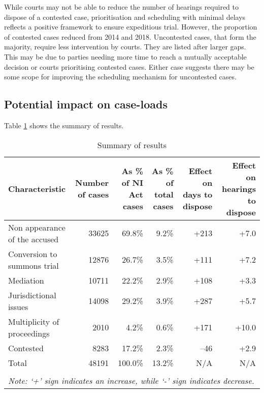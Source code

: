 While courts may not be able to reduce the number of hearings required to dispose of a contested case, prioritisation and scheduling with minimal delays reflects a positive framework to ensure expeditious trial. However, the proportion of contested cases reduced from 2014 and 2018. Uncontested cases, that form the majority, require less intervention by courts. They are listed after larger gaps. This may be due to parties needing more time to reach a mutually acceptable decision or courts prioritising contested cases. Either case suggests there may be some scope for improving the scheduling mechanism for uncontested cases.

\subsection{Potential impact on case-loads} \label{sec:impact-case-loads}

Table \ref{tab:summary_results} shows the summary of results.

{\footnotesize \begin{longtable}{@{}p{2.5cm}rrrrr}
 \caption{Summary of results}\label{tab:summary_results}\\
 \toprule
 \textbf{Characteristic} & \multicolumn{1}{p{2cm}}{\textbf{Number of cases}} &
 \multicolumn{1}{p{2cm}}{\textbf{As \% of NI Act cases}}
 & \multicolumn{1}{p{2cm}}{\textbf{As \% of total cases}}
 & \multicolumn{1}{p{2cm}}{\textbf{Effect on days to dispose}} &
 \multicolumn{1}{p{2cm}}{\textbf{Effect on hearings to dispose}}
 \\
 \midrule
 Non appearance of the accused & 33625 & 69.8\% & 9.2\% & +213 & +7.0 \\ \midrule
 Conversion to summons trial & 12876 & 26.7\% & 3.5\% & +111 & +7.2 \\ \midrule
 Mediation & 10711 & 22.2\% & 2.9\% & +108 & +3.3 \\ \midrule
 Jurisdictional issues & 14098 & 29.2\% & 3.9\% & +287 & +5.7 \\ \midrule
 Multiplicity of proceedings & 2010 & 4.2\% & 0.6\% & +171 & +10.0 \\ \midrule
 Contested & 8283 & 17.2\% & 2.3\% & --46 & +2.9 \\ \midrule
 Total & 48191 & 100.0\% & 13.2\% & N/A & N/A \\
 \bottomrule
 \\
 \multicolumn{6}{l}{{\footnotesize \emph{Note: `+' sign
 indicates an increase, while `-' sign indicates decrease.}}}\\
\end{longtable}
}

